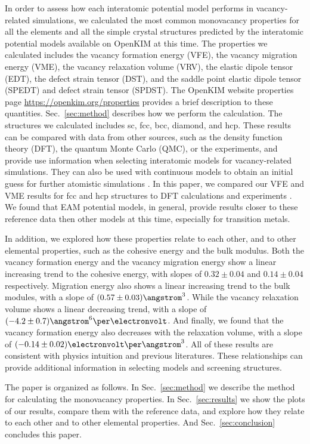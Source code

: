 \documentclass[%
 reprint,
 amsmath,amssymb,
 aps,
]{revtex4-1}
\begin{document}
In order to assess how each interatomic potential model performs in vacancy-related simulations, we calculated the most common monovacancy properties for all the elements and all the simple crystal structures predicted by the interatomic potential models available on OpenKIM at this time.
The properties we calculated includes the vacancy formation energy (VFE), the vacancy migration energy (VME), the vacancy relaxation volume (VRV), the elastic dipole tensor (EDT), the defect strain tensor (DST), and the saddle point elastic dipole tensor (SPEDT) and defect strain tensor (SPDST).
The OpenKIM website properties page \url{https://openkim.org/properties} provides a brief description to these quantities.
Sec.~\ref{sec:method} describes how we perform the calculation.
The structures we calculated includes sc, fcc, bcc, diamond, and hcp.
These results can be compared with data from other sources, such as the density function theory (DFT), the quantum Monte Carlo (QMC), or the experiments, and provide use information when selecting interatomic models for vacancy-related simulations.
They can also be used with continuous models to obtain an initial guess for further atomistic simulations \cite{bozhevolnyi2001multiple}.
In this paper, we compared our VFE and VME results for fcc and hcp structures to DFT calculations and experiments \cite{angsten2014elemental}.
We found that EAM potential models, in general, provide results closer to these reference data then other models at this time, especially for transition metals.

In addition, we explored how these properties relate to each other, and to other elemental properties, such as the cohesive energy and the bulk modulus.
Both the vacancy formation energy and the vacancy migration energy show a linear increasing trend to the cohesive energy, with slopes of $0.32\pm0.04$ and $0.14\pm0.04$ respectively.
Migration energy also shows a linear increasing trend to the bulk modules, with a slope of $(0.57\pm0.03)\angstrom^3$.
While the vacancy relaxation volume shows a linear decreasing trend, with a slope of $(-4.2\pm0.7)\angstrom^6\per\electronvolt$.
And finally, we found that the vacancy formation energy also decreases with the relaxation volume, with a slope of $(-0.14\pm0.02)\electronvolt\per\angstrom^3$.
All of these results are consistent with physics intuition and previous literatures.
These relationships can provide additional information in selecting models and screening structures.

The paper is organized as follows.
In Sec.~\ref{sec:method} we describe the method for calculating the monovacancy properties.
In Sec.~\ref{sec:results} we show the plots of our results, compare them with the reference data, and explore how they relate to each other and to other elemental properties.
And Sec.~\ref{sec:conclusion} concludes this paper.
\end{document}
